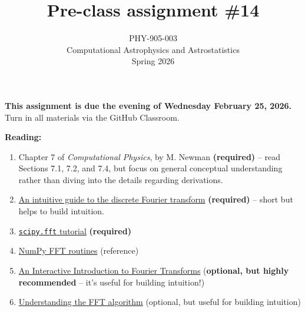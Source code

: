 \documentclass[10pt]{article}
\title{Pre-class assignment \#14}
\author{PHY-905-003\\Computational Astrophysics and
  Astrostatistics\\Spring 2026}
\date{} %
\begin{document}
 
\maketitle

\vspace{-5mm}

\noindent
\textbf{This assignment is due the evening of Wednesday February 25, 2026.}
 Turn in all materials via the GitHub Classroom.

\vspace{5mm}

\noindent
\textbf{Reading:}

\begin{enumerate}

\item Chapter 7 of \textit{Computational Physics}, by M. Newman
  \textbf{(required)} -- read Sections 7.1, 7.2, and 7.4, but focus on
  general conceptual understanding rather than  diving into the
  details regarding derivations.

\item
  \href{http://practicalcryptography.com/miscellaneous/machine-learning/intuitive-guide-discrete-fourier-transform/}{An
    intuitive guide to the discrete Fourier transform}
  \textbf{(required)} -- short but helps to build intuition.

\item
  \href{https://docs.scipy.org/doc/scipy/tutorial/fft.html}{\texttt{scipy.fft}
    tutorial} \textbf{(required)}

\item 
  \href{https://docs.scipy.org/doc/numpy/reference/routines.fft.html}{NumPy
  FFT routines}  (reference)

\item \href{http://www.jezzamon.com/fourier/index.html}{An Interactive
    Introduction to Fourier Transforms} (\textbf{optional, but highly
  recommended} -- it's useful
    for building intuition!)

\item
  \href{http://jakevdp.github.io/blog/2013/08/28/understanding-the-fft/}{Understanding
    the FFT algorithm} (optional, but useful for building
    intuition)

  



\end{enumerate}
\end{document}
